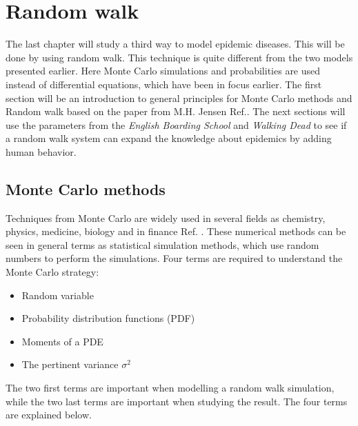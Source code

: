 \documentclass[%
twoside,                 %
final,                   %
chapterprefix=true,      %
open=right               %
10pt]{book}
\begin{document}
\chapter{Random walk}
The last chapter will study a third way to model epidemic diseases. This will be done by using random walk. This technique is quite different from the two models presented earlier. Here Monte Carlo simulations and probabilities are used instead of differential equations, which have been in focus earlier. The first section will be an introduction to general principles for Monte Carlo methods and Random walk based on the paper from M.H. Jensen Ref.\cite{hjorth2011computational}. The next sections will use the parameters from the \emph{English Boarding School} and \emph{Walking Dead} to see if a random walk system can expand the knowledge about epidemics by adding human behavior. 

\section{Monte Carlo methods}
\label{sec:monte_carlo_methods}
Techniques from Monte Carlo are widely used in several fields as chemistry, physics, medicine, biology and in finance Ref. \cite{hjorth2011computational}. These numerical methods can be seen in general terms as statistical simulation methods, which use random numbers to perform the simulations. Four terms are required to understand the Monte Carlo strategy:
\begin{itemize}
\item Random variable

\item Probability distribution functions (PDF)

\item Moments of a PDE

\item The pertinent variance $\sigma ^2$
\end{itemize}

\noindent
The two first terms are important when modelling a random walk simulation, while the two last terms are important when studying the result. The four terms are explained below.
\end{document}
